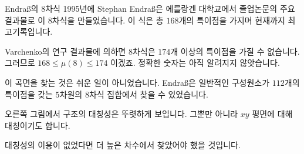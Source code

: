 \begin{surferPage}[Endraß의 $8$차식]{Endraß의 $8$차식}
     1995년에 Stephan Endraß은 에를랑겐 대학교에서 졸업논문의 주요 결과물로 이 $8$차식을 만들었습니다. 이 식은 총 $168$개의 특이점을 가지며 현재까지 최고기록입니다.

    Varchenko의 연구 결과물에 의하면 $8$차식은 $174$개 이상의 특이점을 가질 수 없습니다. 그러므로 $168 \le \mu(8) \le 174$ 이겠죠. 정확한 숫자는 아직 알려지지 않앗습니다.

    이 곡면을 찾는 것은 쉬운 일이 아니었습니다. Endraß은 일반적인 구성원소가 $112$개의 특이점을 갖는 $5$차원의 $8$차식 집합에서 찾을 수 있었습니다. 
 

    오른쪽 그림에서 구조의 대칭성은 뚜렷하게 보입니다. 그뿐만 아니라 $xy$ 평면에 대해 대칭이기도 합니다. 

    대칭성의 이용이 없었다면 더 높은 차수에서 찾았어야 했을 것입니다.
\end{surferPage}
